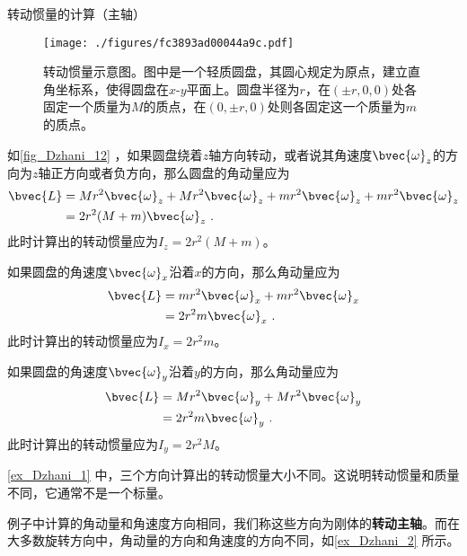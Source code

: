 \begin{example}{转动惯量的计算（主轴）}\label{ex_Dzhani_1}


\begin{figure}[ht]
\centering
\texttt{[image: ./figures/fc3893ad00044a9c.pdf]}
\caption{转动惯量示意图。图中是一个轻质圆盘，其圆心规定为原点，建立直角坐标系，使得圆盘在$x$-$y$平面上。圆盘半径为$r$，在$(\pm r, 0, 0)$处各固定一个质量为$M$的质点，在$(0, \pm r, 0)$处则各固定这一个质量为$m$的质点。} \label{fig_Dzhani_12}
\end{figure}


如\autoref{fig_Dzhani_12} ，如果圆盘绕着$z$轴方向转动，或者说其角速度$\bvec{\omega}_z$的方向为$z$轴正方向或者负方向，那么圆盘的角动量应为
\begin{equation}
\begin{aligned}
\bvec{L} ={}& Mr^2\bvec{\omega}_z+Mr^2\bvec{\omega}_z+mr^2\bvec{\omega}_z+mr^2\bvec{\omega}_z\\
={}& 2r^2(M+m)\bvec{\omega}_z ~.
\end{aligned}
\end{equation}
此时计算出的转动惯量应为$I_z=2r^2(M+m)$。

如果圆盘的角速度$\bvec{\omega}_x$沿着$x$的方向，那么角动量应为
\begin{equation}
\begin{aligned}
\bvec{L} ={}& mr^2\bvec{\omega}_x+mr^2\bvec{\omega}_x\\
={}& 2r^2m\bvec{\omega}_x ~.
\end{aligned}
\end{equation}
此时计算出的转动惯量应为$I_x=2r^2m$。

如果圆盘的角速度$\bvec{\omega}_y$沿着$y$的方向，那么角动量应为
\begin{equation}
\begin{aligned}
\bvec{L} ={}& Mr^2\bvec{\omega}_y+Mr^2\bvec{\omega}_y\\
={}& 2r^2m\bvec{\omega}_y ~.
\end{aligned}
\end{equation}
此时计算出的转动惯量应为$I_y=2r^2M$。




\end{example}



\autoref{ex_Dzhani_1} 中，三个方向计算出的转动惯量大小不同。这说明转动惯量和质量不同，它通常不是一个标量。


例子中计算的角动量和角速度方向相同，我们称这些方向为刚体的\textbf{转动主轴}。而在大多数旋转方向中，角动量的方向和角速度的方向不同，如\autoref{ex_Dzhani_2} 所示。


